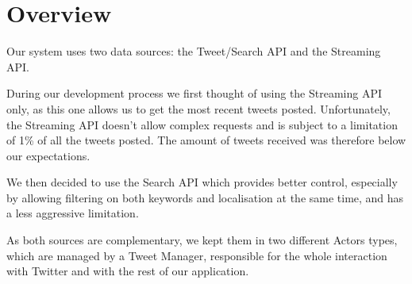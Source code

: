 \section{Overview}

Our system uses two data sources: the Tweet/Search API and the Streaming API.

During our development process we first thought of using the Streaming API only, as this one allows us to get the most recent tweets posted. Unfortunately, the Streaming API doesn't allow complex requests and is subject to a limitation of 1\% of all the tweets posted. The amount of tweets received was therefore below our expectations.

We then decided to use the Search API which provides better control, especially by allowing filtering on both keywords and localisation at the same time, and has a less aggressive limitation.

As both sources are complementary, we kept them in two different Actors types, which are managed by a Tweet Manager, responsible for the whole interaction with Twitter and with the rest of our application.

